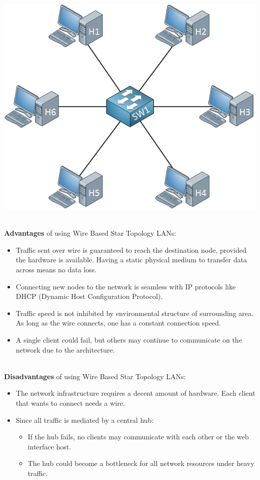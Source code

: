 	\begin{center}
		\includegraphics[scale=0.5]{switch-star-topology-hosts.png}
	\end{center} \cite{IMG1}

	\newpage %

	\noindent \\ \textbf{Advantages} of using Wire Based Star Topology LANs:
	\begin{itemize}
		\item Traffic sent over wire is guaranteed to reach the destination node, provided the hardware is available.  Having a static physical medium to transfer data across means no data loss.
		\item Connecting new nodes to the network is seamless with IP protocols like DHCP (Dynamic Host Configuration Protocol).
		\item Traffic speed is not inhibited by environmental structure of surrounding area.  As long as the wire connects, one has a constant connection speed.
		\item A single client could fail, but others may continue to communicate on the network due to the architecture.
	\end{itemize}

	\noindent \\ \textbf{Disadvantages} of using Wire Based Star Topology LANs:
	\begin{itemize}
		\item The network infrastructure requires a decent amount of hardware.  Each client that wants to connect needs a wire.
		\item Since all traffic is mediated by a central hub:
		\begin{itemize}
			\item If the hub fails, no clients may communicate with each other or the web interface host.
			\item The hub could become a bottleneck for all network resources under heavy traffic.
		\end{itemize}
	\end{itemize}

